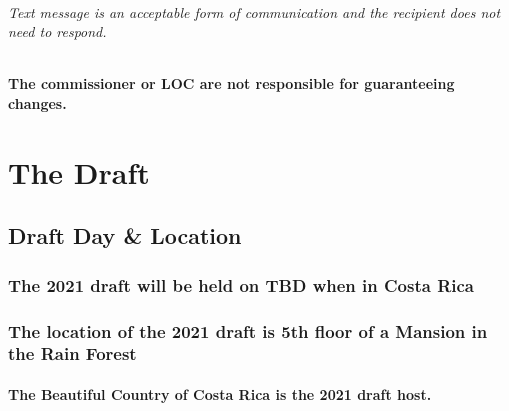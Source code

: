 \documentclass[
]{book}
\begin{document}
\hypertarget{text-message-is-an-acceptable-form-of-communication-and-the-recipient-does-not-need-to-respond.}{%
\subparagraph{Text message is an acceptable form of communication and the recipient does not need to respond.}\label{text-message-is-an-acceptable-form-of-communication-and-the-recipient-does-not-need-to-respond.}}

\hypertarget{the-commissioner-or-loc-are-not-responsible-for-guaranteeing-changes.}{%
\subsubsection{The commissioner or LOC are not responsible for guaranteeing changes.}\label{the-commissioner-or-loc-are-not-responsible-for-guaranteeing-changes.}}

\hypertarget{the-draft}{%
\chapter{The Draft}\label{the-draft}}

\hypertarget{draft-day-location}{%
\section{Draft Day \& Location}\label{draft-day-location}}

\hypertarget{the-2021-draft-will-be-held-on-tbd-when-in-costa-rica}{%
\subsection{The 2021 draft will be held on TBD when in Costa Rica}\label{the-2021-draft-will-be-held-on-tbd-when-in-costa-rica}}

\hypertarget{the-location-of-the-2021-draft-is-5th-floor-of-a-mansion-in-the-rain-forest}{%
\subsection{The location of the 2021 draft is 5th floor of a Mansion in the Rain Forest}\label{the-location-of-the-2021-draft-is-5th-floor-of-a-mansion-in-the-rain-forest}}

\hypertarget{the-beautiful-country-of-costa-rica-is-the-2021-draft-host.}{%
\subsubsection{The Beautiful Country of Costa Rica is the 2021 draft host.}\label{the-beautiful-country-of-costa-rica-is-the-2021-draft-host.}}
\end{document}
